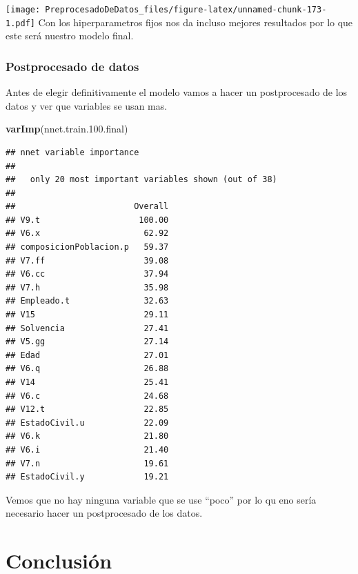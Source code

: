 \documentclass[
]{article}
\newenvironment{Shaded}{\begin{snugshade}}{\end{snugshade}}
\newcommand{\FloatTok}[1]{\textcolor[rgb]{0.00,0.00,0.81}{#1}}
\newcommand{\FunctionTok}[1]{\textcolor[rgb]{0.13,0.29,0.53}{\textbf{#1}}}
\newcommand{\NormalTok}[1]{#1}
\begin{document}
\texttt{[image: PreprocesadoDeDatos\_files/figure-latex/unnamed-chunk-173-1.pdf]}
Con los hiperparametros fijos nos da incluso mejores resultados por lo
que este será nuestro modelo final.

\hypertarget{postprocesado-de-datos-1}{%
\subsubsection{Postprocesado de datos}\label{postprocesado-de-datos-1}}

Antes de elegir definitivamente el modelo vamos a hacer un postprocesado
de los datos y ver que variables se usan mas.

\begin{Shaded}
\begin{Highlighting}[]
\FunctionTok{varImp}\NormalTok{(nnet.train.}\FloatTok{100.}\NormalTok{final)}
\end{Highlighting}
\end{Shaded}

\begin{verbatim}
## nnet variable importance
## 
##   only 20 most important variables shown (out of 38)
## 
##                        Overall
## V9.t                    100.00
## V6.x                     62.92
## composicionPoblacion.p   59.37
## V7.ff                    39.08
## V6.cc                    37.94
## V7.h                     35.98
## Empleado.t               32.63
## V15                      29.11
## Solvencia                27.41
## V5.gg                    27.14
## Edad                     27.01
## V6.q                     26.88
## V14                      25.41
## V6.c                     24.68
## V12.t                    22.85
## EstadoCivil.u            22.09
## V6.k                     21.80
## V6.i                     21.40
## V7.n                     19.61
## EstadoCivil.y            19.21
\end{verbatim}

Vemos que no hay ninguna variable que se use ``poco'' por lo qu eno
sería necesario hacer un postprocesado de los datos.

\hypertarget{conclusiuxf3n-3}{%
\section{Conclusión}\label{conclusiuxf3n-3}}
\end{document}
